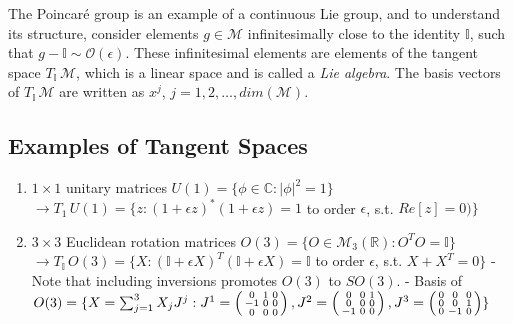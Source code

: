 \noindent The Poincar\'e group is an example of a continuous Lie group, and to understand its structure, consider elements $g \in \mathcal{M}$ infinitesimally close to the identity $\mathbb{I}$, such that $g - \mathbb{I} \sim \mathcal{O}(\epsilon)$. These infinitesimal elements are elements of the tangent space $T_{\mathbb{I}} \, \mathcal{M}$, which is a linear space and is called a \textit{Lie algebra}. The basis vectors of $T_{\mathbb{I}} \, \mathcal{M}$ are written as $x^j$, $j=1,2,\dots,dim(\mathcal{M})$.

\subsection*{Examples of Tangent Spaces}

\begin{enumerate}
\item $1 \times 1$ unitary matrices $U(1) = \{ \phi \in \mathbb{C} : |\phi|^2 = 1 \}$
\subitem $\rightarrow T_1 \, U(1) = \{ z: (1+\epsilon z)^* (1+\epsilon z) = 1$ to order $\epsilon$,  s.t. $Re[z]=0) \}$

\item $3 \times 3$ Euclidean rotation matrices $O(3) = \{ O \in \mathcal{M}_3(\mathbb{R}) : O^T O = \mathbb{I} \}$
\subitem $\rightarrow T_{\mathbb{I}} \, O(3) = \{ X : (\mathbb{I} + \epsilon X)^T (\mathbb{I} + \epsilon X) = \mathbb{I}$ to order $\epsilon$, s.t. $X + X^T = 0 \}$
\subitem - Note that including inversions promotes $O(3)$ to $SO(3)$.
\subitem - Basis of $O(3) = \\ \{ X = \sum_{j=1}^3 X_j J^j : J^1 = \left(\begin{smallmatrix} 0&1&0 \\ -1&0&0 \\ 0&0&0 \end{smallmatrix}\right), J^2 = \left(\begin{smallmatrix} 0&0&1 \\ 0&0&0 \\ -1&0&0 \end{smallmatrix}\right), J^3 = \left(\begin{smallmatrix} 0&0&0 \\ 0&0&1 \\ 0&-1&0 \end{smallmatrix}\right) \}$


\end{enumerate}
